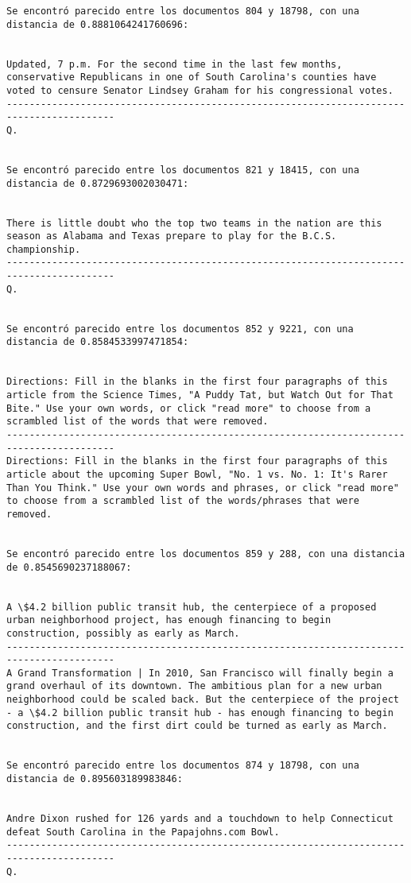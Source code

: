 \documentclass[11pt]{article}
\begin{document}
\begin{Verbatim}[commandchars=\\\{\}]
Se encontró parecido entre los documentos 804 y 18798, con una distancia de 0.8881064241760696:


Updated, 7 p.m. For the second time in the last few months, conservative Republicans in one of South Carolina's counties have voted to censure Senator Lindsey Graham for his congressional votes.
-----------------------------------------------------------------------------------------
Q.


Se encontró parecido entre los documentos 821 y 18415, con una distancia de 0.8729693002030471:


There is little doubt who the top two teams in the nation are this season as Alabama and Texas prepare to play for the B.C.S. championship. 
-----------------------------------------------------------------------------------------
Q.


Se encontró parecido entre los documentos 852 y 9221, con una distancia de 0.8584533997471854:


Directions: Fill in the blanks in the first four paragraphs of this article from the Science Times, "A Puddy Tat, but Watch Out for That Bite." Use your own words, or click "read more" to choose from a scrambled list of the words that were removed.
-----------------------------------------------------------------------------------------
Directions: Fill in the blanks in the first four paragraphs of this article about the upcoming Super Bowl, "No. 1 vs. No. 1: It's Rarer Than You Think." Use your own words and phrases, or click "read more" to choose from a scrambled list of the words/phrases that were removed.


Se encontró parecido entre los documentos 859 y 288, con una distancia de 0.8545690237188067:


A \$4.2 billion public transit hub, the centerpiece of a proposed urban neighborhood project, has enough financing to begin construction, possibly as early as March.
-----------------------------------------------------------------------------------------
A Grand Transformation | In 2010, San Francisco will finally begin a grand overhaul of its downtown. The ambitious plan for a new urban neighborhood could be scaled back. But the centerpiece of the project - a \$4.2 billion public transit hub - has enough financing to begin construction, and the first dirt could be turned as early as March.


Se encontró parecido entre los documentos 874 y 18798, con una distancia de 0.895603189983846:


Andre Dixon rushed for 126 yards and a touchdown to help Connecticut defeat South Carolina in the Papajohns.com Bowl.
-----------------------------------------------------------------------------------------
Q.



\end{Verbatim}
\end{document}
